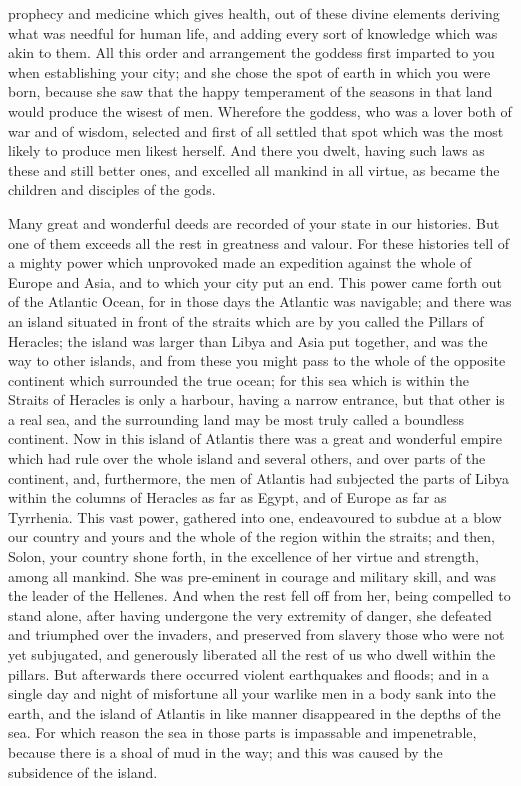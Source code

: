 \documentclass[11pt,letter]{article}
\begin{document}
prophecy and medicine which gives health, out of these divine elements deriving what was needful for human life, and adding every sort of knowledge which was akin to them. All this order and arrangement the goddess first imparted to you when establishing your city; and she chose the spot of earth in which you were born, because she saw that the happy temperament of the seasons in that land would produce the wisest of men. Wherefore the goddess, who was a lover both of war and of wisdom, selected and first of all settled that spot which was the most likely to produce men likest herself. And there you dwelt, having such laws as these and still better ones, and excelled all mankind in all virtue, as became the children and disciples of the gods.

\par  Many great and wonderful deeds are recorded of your state in our histories. But one of them exceeds all the rest in greatness and valour. For these histories tell of a mighty power which unprovoked made an expedition against the whole of Europe and Asia, and to which your city put an end. This power came forth out of the Atlantic Ocean, for in those days the Atlantic was navigable; and there was an island situated in front of the straits which are by you called the Pillars of Heracles; the island was larger than Libya and Asia put together, and was the way to other islands, and from these you might pass to the whole of the opposite continent which surrounded the true ocean; for this sea which is within the Straits of Heracles is only a harbour, having a narrow entrance, but that other is a real sea, and the surrounding land may be most truly called a boundless continent. Now in this island of Atlantis there was a great and wonderful empire which had rule over the whole island and several others, and over parts of the continent, and, furthermore, the men of Atlantis had subjected the parts of Libya within the columns of Heracles as far as Egypt, and of Europe as far as Tyrrhenia. This vast power, gathered into one, endeavoured to subdue at a blow our country and yours and the whole of the region within the straits; and then, Solon, your country shone forth, in the excellence of her virtue and strength, among all mankind. She was pre-eminent in courage and military skill, and was the leader of the Hellenes. And when the rest fell off from her, being compelled to stand alone, after having undergone the very extremity of danger, she defeated and triumphed over the invaders, and preserved from slavery those who were not yet subjugated, and generously liberated all the rest of us who dwell within the pillars. But afterwards there occurred violent earthquakes and floods; and in a single day and night of misfortune all your warlike men in a body sank into the earth, and the island of Atlantis in like manner disappeared in the depths of the sea. For which reason the sea in those parts is impassable and impenetrable, because there is a shoal of mud in the way; and this was caused by the subsidence of the island.
\end{document}
